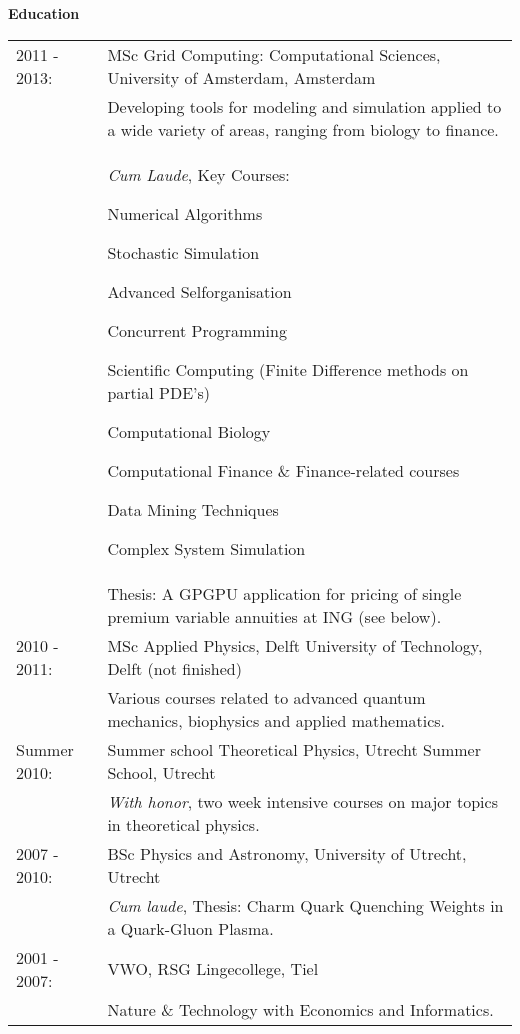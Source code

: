 \documentclass[11pt,a4paper,onecolumn]{article}
\begin{document}
{\Large \textbf{Education} }
\begin{table}[H]
  \begin{tabular}{p{} p{}}
    2011 - 2013: & MSc Grid Computing: Computational Sciences, University of Amsterdam, Amsterdam \\
    & {\small Developing tools for modeling and simulation applied to a wide variety of areas, ranging from biology to finance.} \\
    & {\small \emph{Cum Laude}, Key Courses:} {\footnotesize \begin{itemize*}
      \item
        Numerical Algorithms
      \item
        Stochastic Simulation
      \item
        Advanced Selforganisation
      \item
        Concurrent Programming
      \item
        Scientific Computing (Finite Difference methods on partial PDE's)
      \item
        Computational Biology
      \item
        Computational Finance \& Finance-related courses
      \item
        Data Mining Techniques
      \item
        Complex System Simulation
      \end{itemize*}
    } \\
    & {\small Thesis: A GPGPU application for pricing of single premium variable annuities at ING (see below). } \\

    2010 - 2011: & MSc Applied Physics, Delft University of Technology, Delft (not finished) \\
    & {\small Various courses related to advanced quantum mechanics, biophysics and applied mathematics. } \\

    Summer 2010: & Summer school Theoretical Physics, Utrecht Summer School, Utrecht \\
    & {\small \emph{With honor}, two week intensive courses on major topics in theoretical physics.} \\

    2007 - 2010: & BSc Physics and Astronomy, University of Utrecht, Utrecht \\
    & {\small \emph{Cum laude}, Thesis: Charm Quark Quenching Weights in a Quark-Gluon Plasma.} \\

    2001 - 2007: & VWO, RSG Lingecollege, Tiel \\
    & {\small Nature \& Technology with Economics and Informatics.} \\

  \end{tabular}
\end{table}
\end{document}

